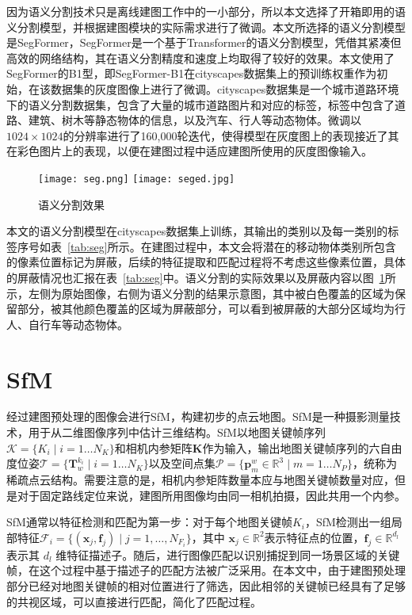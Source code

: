 因为语义分割技术只是离线建图工作中的一小部分，所以本文选择了开箱即用的语义分割模型，并根据建图模块的实际需求进行了微调。本文所选择的语义分割模型是SegFormer\cite{xie2021segformer}，SegFormer是一个基于Transformer的语义分割模型，凭借其紧凑但高效的网络结构，其在语义分割精度和速度上均取得了较好的效果。本文使用了SegFormer的B1型，即SegFormer-B1在cityscapes\cite{Cordts2016Cityscapes}数据集上的预训练权重作为初始，在该数据集的灰度图像上进行了微调。cityscapes数据集是一个城市道路环境下的语义分割数据集，包含了大量的城市道路图片和对应的标签，标签中包含了道路、建筑、树木等静态物体的信息，以及汽车、行人等动态物体。微调以$1024 \times 1024$的分辨率进行了160,000轮迭代，使得模型在灰度图上的表现接近了其在彩色图片上的表现，以便在建图过程中适应建图所使用的灰度图像输入。

\begin{figure}
  \centering
  \texttt{[image: seg.png]}
  \texttt{[image: seged.jpg]}
  \caption{语义分割效果}
  \label{fig:seg}
\end{figure}

本文的语义分割模型在cityscapes数据集上训练，其输出的类别以及每一类别的标签序号如表~\ref{tab:seg}所示。在建图过程中，本文会将潜在的移动物体类别所包含的像素位置标记为屏蔽，后续的特征提取和匹配过程将不考虑这些像素位置，具体的屏蔽情况也汇报在表~\ref{tab:seg}中。语义分割的实际效果以及屏蔽内容以图~\ref{fig:seg}所示，左侧为原始图像，右侧为语义分割的结果示意图，其中被白色覆盖的区域为保留部分，被其他颜色覆盖的区域为屏蔽部分，可以看到被屏蔽的大部分区域均为行人、自行车等动态物体。

\section{SfM}

经过建图预处理的图像会进行SfM，构建初步的点云地图。SfM是一种摄影测量技术，用于从二维图像序列中估计三维结构\cite{schonberger2016structure}。SfM以地图关键帧序列$\mathcal{K} = \{K_i \mid i=1 \ldots N_{K} \}$和相机内参矩阵$\mathbf{K}$作为输入，输出地图关键帧序列的六自由度位姿$\mathcal{T} = \{\mathbf{T}^{k_i}_w \mid i=1 \ldots N_K \}$以及空间点集$\mathcal{P} = \{\mathbf{p}_{m}^{w} \in \mathbb{R}^3 \mid m=1 \ldots N_P\}$，统称为稀疏点云结构。需要注意的是，相机内参矩阵数量本应与地图关键帧数量对应，但是对于固定路线定位来说，建图所用图像均由同一相机拍摄，因此共用一个内参。

SfM通常以特征检测和匹配为第一步：对于每个地图关键帧$K_i$，SfM检测出一组局部特征$\mathcal{F}_i = \{(\mathbf{x}_j, \mathbf{f}_j) \mid j = 1, \ldots, N_{F_i}\}$，其中 $\mathbf{x}_j \in \mathbb{R}^2$表示特征点的位置，$\mathbf{f}_j \in \mathbb{R}^{d_l}$ 表示其 ${d_l}$ 维特征描述子。随后，进行图像匹配以识别捕捉到同一场景区域的关键帧，在这个过程中基于描述子的匹配方法被广泛采用。在本文中，由于建图预处理部分已经对地图关键帧的相对位置进行了筛选，因此相邻的关键帧已经具有了足够的共视区域，可以直接进行匹配，简化了匹配过程。

